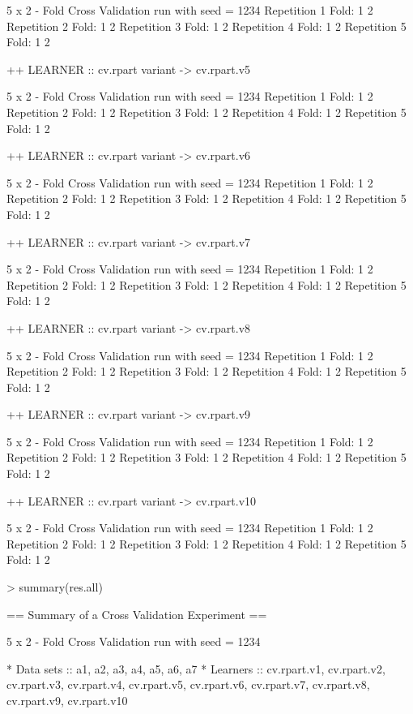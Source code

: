 \documentclass{article}
\begin{document}
\begin{Schunk}
\begin{Soutput}
 5 x 2 - Fold Cross Validation run with seed =  1234 
Repetition  1 
Fold:  1  2
Repetition  2 
Fold:  1  2
Repetition  3 
Fold:  1  2
Repetition  4 
Fold:  1  2
Repetition  5 
Fold:  1  2


++ LEARNER :: cv.rpart  variant ->  cv.rpart.v5 

 5 x 2 - Fold Cross Validation run with seed =  1234 
Repetition  1 
Fold:  1  2
Repetition  2 
Fold:  1  2
Repetition  3 
Fold:  1  2
Repetition  4 
Fold:  1  2
Repetition  5 
Fold:  1  2


++ LEARNER :: cv.rpart  variant ->  cv.rpart.v6 

 5 x 2 - Fold Cross Validation run with seed =  1234 
Repetition  1 
Fold:  1  2
Repetition  2 
Fold:  1  2
Repetition  3 
Fold:  1  2
Repetition  4 
Fold:  1  2
Repetition  5 
Fold:  1  2


++ LEARNER :: cv.rpart  variant ->  cv.rpart.v7 

 5 x 2 - Fold Cross Validation run with seed =  1234 
Repetition  1 
Fold:  1  2
Repetition  2 
Fold:  1  2
Repetition  3 
Fold:  1  2
Repetition  4 
Fold:  1  2
Repetition  5 
Fold:  1  2


++ LEARNER :: cv.rpart  variant ->  cv.rpart.v8 

 5 x 2 - Fold Cross Validation run with seed =  1234 
Repetition  1 
Fold:  1  2
Repetition  2 
Fold:  1  2
Repetition  3 
Fold:  1  2
Repetition  4 
Fold:  1  2
Repetition  5 
Fold:  1  2


++ LEARNER :: cv.rpart  variant ->  cv.rpart.v9 

 5 x 2 - Fold Cross Validation run with seed =  1234 
Repetition  1 
Fold:  1  2
Repetition  2 
Fold:  1  2
Repetition  3 
Fold:  1  2
Repetition  4 
Fold:  1  2
Repetition  5 
Fold:  1  2


++ LEARNER :: cv.rpart  variant ->  cv.rpart.v10 

 5 x 2 - Fold Cross Validation run with seed =  1234 
Repetition  1 
Fold:  1  2
Repetition  2 
Fold:  1  2
Repetition  3 
Fold:  1  2
Repetition  4 
Fold:  1  2
Repetition  5 
Fold:  1  2
\end{Soutput}
\begin{Sinput}
> summary(res.all)
\end{Sinput}
\begin{Soutput}
== Summary of a  Cross Validation  Experiment ==

 5 x 2 - Fold Cross Validation run with seed =  1234 

* Data sets ::  a1, a2, a3, a4, a5, a6, a7
* Learners  ::  cv.rpart.v1, cv.rpart.v2, cv.rpart.v3, cv.rpart.v4, cv.rpart.v5, cv.rpart.v6, cv.rpart.v7, cv.rpart.v8, cv.rpart.v9, cv.rpart.v10


\end{Soutput}
\end{Schunk}
\end{document}
